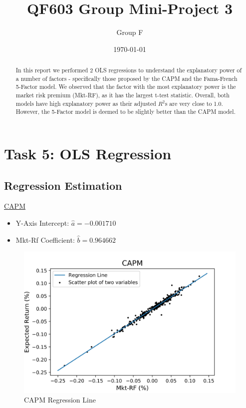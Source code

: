 \documentclass[a4paper]{article}
\title{QF603 Group Mini-Project 3}
\author{Group F}
\date{\today}
\begin{document}
	\maketitle
	
	\begin{abstract}
	\vspace{6pt}
		In this report we performed 2 OLS regressions to understand the explanatory power of a number of factors - specifically those proposed by the CAPM and the Fama-French 5-Factor model. We observed that the factor with the most explanatory power is the market risk premium (Mkt-RF), as it has the largest t-test statistic. Overall, both models have high explanatory power as their adjusted $R^2$s are very close to 1.0. However, the 5-Factor model is deemed to be slightly better than the CAPM model.
	\end{abstract}

\newpage
\setcounter{secnumdepth}{1}
\section*{Task 5: OLS Regression}
\label{sec:introduction}

\subsection{Regression Estimation}
\underline{CAPM}
\begin{itemize}[nosep]
	\item Y-Axis Intercept: $\hat{a}= -0.001710$
	\item Mkt-Rf Coefficient: $\hat{b}=0.964662$
\end{itemize}

\begin{figure}[ht]
	\centering
	\includegraphics[width= \linewidth]{CAPM_regression.jpeg}
	\captionsetup{font=small}
	\caption{CAPM Regression Line}
\end{figure}
\end{document}
